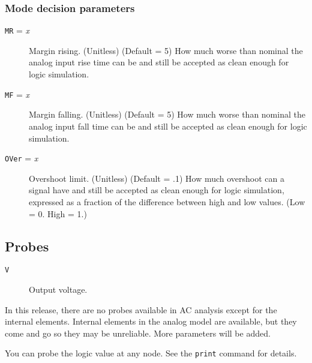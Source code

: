 \subsubsection{Mode decision parameters}
\begin{description}

\item[{\tt MR} = {\it x}] Margin rising.  (Unitless) (Default = 5) How much
worse than nominal the analog input rise time can be and still be accepted
as clean enough for logic simulation.

\item[{\tt MF} = {\it x}] Margin falling.  (Unitless) (Default = 5) How much
worse than nominal the analog input fall time can be and still be accepted
as clean enough for logic simulation.

\item[{\tt OVer} = {\it x}] Overshoot limit.  (Unitless) (Default = .1) How
much overshoot can a signal have and still be accepted as clean enough for
logic simulation, expressed as a fraction of the difference between high and
low values.  (Low = 0.  High = 1.)

\end{description}
\subsection{Probes}

\begin{description}

\item[{\tt V}] Output voltage.

\end{description}

In this release, there are no probes available in AC analysis except for the
internal elements.  Internal elements in the analog model are available, but
they come and go so they may be unreliable.  More parameters will be added.

You can probe the logic value at any node.  See the {\tt print} command for
details.
